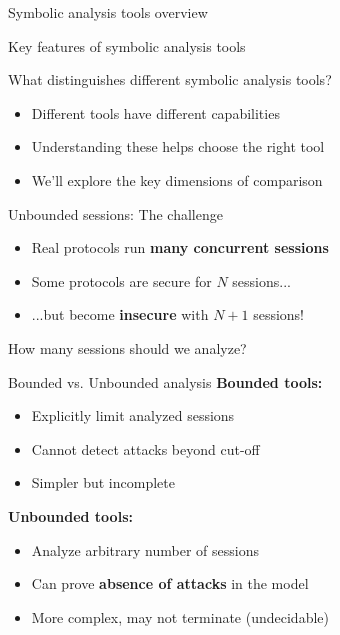 \documentclass[aspectratio=169, lualatex, handout]{beamer}
\begin{document}
\begin{frame}{Symbolic analysis tools overview}
\end{frame}

\begin{frame}{Key features of symbolic analysis tools}
	\begin{center}
		\Large
		What distinguishes different symbolic analysis tools?
	\end{center}
	\vspace{1em}
	\begin{itemize}
		\item Different tools have different capabilities
		\item Understanding these helps choose the right tool
		\item We'll explore the key dimensions of comparison
	\end{itemize}
\end{frame}

\begin{frame}{Unbounded sessions: The challenge}
	\begin{itemize}
		\item Real protocols run \textbf{many concurrent sessions}
		\item Some protocols are secure for $N$ sessions...
		\item ...but become \textbf{insecure} with $N+1$ sessions!
	\end{itemize}
	\vspace{1em}
	\begin{center}
		\Large
		How many sessions should we analyze?
	\end{center}
\end{frame}

\begin{frame}{Bounded vs. Unbounded analysis}
	\textbf{Bounded tools:}
	\begin{itemize}
		\item Explicitly limit analyzed sessions
		\item Cannot detect attacks beyond cut-off
		\item Simpler but incomplete
	\end{itemize}
	\vspace{0.5em}
	\textbf{Unbounded tools:}
	\begin{itemize}
		\item Analyze arbitrary number of sessions
		\item Can prove \textbf{absence of attacks} in the model
		\item More complex, may not terminate (undecidable)
	\end{itemize}
\end{frame}
\end{document}
